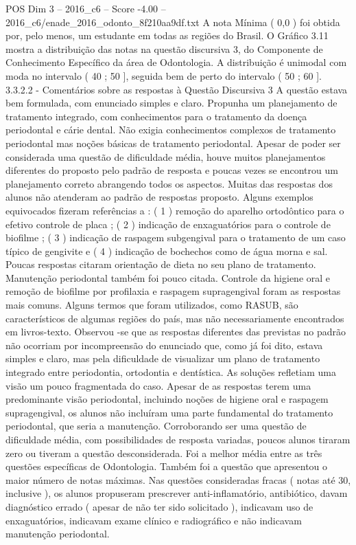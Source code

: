 \begin{textsample}{POS Dim 3 – 2016\_c6 – Score -4.00 – 2016\_c6/enade\_2016\_odonto\_8f210aa9df.txt}
A nota Mínima ( 0,0 ) foi obtida por, pelo menos, um estudante em todas as regiões do Brasil.
O Gráfico 3.11 mostra a distribuição das notas na questão discursiva 3, do Componente de Conhecimento Específico da área de Odontologia.
A distribuição é unimodal com moda no intervalo ( 40 ; 50 ], seguida bem de perto do intervalo ( 50 ; 60 ]. 3.3.2.2 - Comentários sobre as respostas à Questão Discursiva 3 A questão estava bem formulada, com enunciado simples e claro.
Propunha um planejamento de tratamento integrado, com conhecimentos para o tratamento da doença periodontal e cárie dental.
Não exigia conhecimentos complexos de tratamento periodontal mas noções básicas de tratamento periodontal.
Apesar de poder ser considerada uma questão de dificuldade média, houve muitos planejamentos diferentes do proposto pelo padrão de resposta e poucas vezes se encontrou um planejamento correto abrangendo todos os aspectos.
Muitas das respostas dos alunos não atenderam ao padrão de respostas proposto.
Alguns exemplos equivocados fizeram referências a : ( 1 ) remoção do aparelho ortodôntico para o efetivo controle de placa ; ( 2 ) indicação de enxaguatórios para o controle de biofilme ; ( 3 ) indicação de raspagem subgengival para o tratamento de um caso típico de gengivite e ( 4 ) indicação de bochechos como de água morna e sal.
Poucas respostas citaram orientação de dieta no seu plano de tratamento.
Manutenção periodontal também foi pouco citada.
Controle da higiene oral e remoção de biofilme por profilaxia e raspagem supragengival foram as respostas mais comuns.
Alguns termos que foram utilizados, como RASUB, são característicos de algumas regiões do país, mas não necessariamente encontrados em livros-texto.
Observou -se que as respostas diferentes das previstas no padrão não ocorriam por incompreensão do enunciado que, como já foi dito, estava simples e claro, mas pela dificuldade de visualizar um plano de tratamento integrado entre periodontia, ortodontia e dentística.
As soluções refletiam uma visão um pouco fragmentada do caso.
Apesar de as respostas terem uma predominante visão periodontal, incluindo noções de higiene oral e raspagem supragengival, os alunos não incluíram uma parte fundamental do tratamento periodontal, que seria a manutenção.
Corroborando ser uma questão de dificuldade média, com possibilidades de resposta variadas, poucos alunos tiraram zero ou tiveram a questão desconsiderada.
Foi a melhor média entre as três questões específicas de Odontologia.
Também foi a questão que apresentou o maior número de notas máximas.
Nas questões consideradas fracas ( notas até 30, inclusive ), os alunos propuseram prescrever anti-inflamatório, antibiótico, davam diagnóstico errado ( apesar de não ter sido solicitado ), indicavam uso de enxaguatórios, indicavam exame clínico e radiográfico e não indicavam manutenção periodontal.

\end{textsample}
